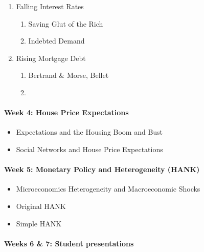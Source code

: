 \documentclass[a4paper,11pt]{article}
\begin{document}
\begin{enumerate}
\item Falling Interest Rates
  \begin{enumerate}
  \item Saving Glut of the Rich \citep{kumhof2015inequality}
  \item Indebted Demand \citep{mian2021indebted-demand}
  \end{enumerate}
\item Rising Mortgage Debt
  \begin{enumerate}
  \item Bertrand \& Morse, Bellet
  \item \citet{drechsel2021falling-behind}
  \end{enumerate}
\end{enumerate}

\paragraph{Week 4: House Price Expectations}
\begin{itemize}
\item Expectations and the Housing Boom and Bust \citep{kaplan2018microeconomic}
\item Social Networks and House Price Expectations \citep{bailey2019beliefs-leverage,bailey2019beliefs-leverage}
\end{itemize}

\paragraph{Week 5: Monetary Policy and Heterogeneity (HANK)}
\begin{itemize}
\item Microeconomics Heterogeneity and Macroeconomic Shocks \citep{kaplan2018microeconomic}
\item Original HANK \citep{kaplan2018monetary}
\item Simple HANK \citep{bilbiie2018analytical}
\end{itemize}

\paragraph{Weeks 6 \& 7: Student presentations}


\end{document}
